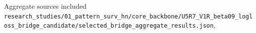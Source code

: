 \documentclass[pdflatex,sn-nature]{sn-jnl}
\begin{document}
Aggregate sources included {\footnotesize\texttt{r\allowbreak{}e\allowbreak{}s\allowbreak{}e\allowbreak{}a\allowbreak{}r\allowbreak{}c\allowbreak{}h\allowbreak{}\_\allowbreak{}s\allowbreak{}t\allowbreak{}u\allowbreak{}d\allowbreak{}i\allowbreak{}e\allowbreak{}s\allowbreak{}/\allowbreak{}0\allowbreak{}1\allowbreak{}\_\allowbreak{}p\allowbreak{}a\allowbreak{}t\allowbreak{}t\allowbreak{}e\allowbreak{}r\allowbreak{}n\allowbreak{}\_\allowbreak{}s\allowbreak{}u\allowbreak{}r\allowbreak{}v\allowbreak{}\_\allowbreak{}h\allowbreak{}n\allowbreak{}/\allowbreak{}c\allowbreak{}o\allowbreak{}r\allowbreak{}e\allowbreak{}\_\allowbreak{}b\allowbreak{}a\allowbreak{}c\allowbreak{}k\allowbreak{}b\allowbreak{}o\allowbreak{}n\allowbreak{}e\allowbreak{}/\allowbreak{}U\allowbreak{}5\allowbreak{}R\allowbreak{}7\allowbreak{}\_\allowbreak{}V\allowbreak{}1\allowbreak{}R\allowbreak{}\_\allowbreak{}b\allowbreak{}e\allowbreak{}t\allowbreak{}a\allowbreak{}0\allowbreak{}9\allowbreak{}\_\allowbreak{}l\allowbreak{}o\allowbreak{}g\allowbreak{}l\allowbreak{}o\allowbreak{}s\allowbreak{}s\allowbreak{}\_\allowbreak{}b\allowbreak{}r\allowbreak{}i\allowbreak{}d\allowbreak{}g\allowbreak{}e\allowbreak{}\_\allowbreak{}c\allowbreak{}a\allowbreak{}n\allowbreak{}d\allowbreak{}i\allowbreak{}d\allowbreak{}a\allowbreak{}t\allowbreak{}e\allowbreak{}/\allowbreak{}s\allowbreak{}e\allowbreak{}l\allowbreak{}e\allowbreak{}c\allowbreak{}t\allowbreak{}e\allowbreak{}d\allowbreak{}\_\allowbreak{}b\allowbreak{}r\allowbreak{}i\allowbreak{}d\allowbreak{}g\allowbreak{}e\allowbreak{}\_\allowbreak{}a\allowbreak{}g\allowbreak{}g\allowbreak{}r\allowbreak{}e\allowbreak{}g\allowbreak{}a\allowbreak{}t\allowbreak{}e\allowbreak{}\_\allowbreak{}r\allowbreak{}e\allowbreak{}s\allowbreak{}u\allowbreak{}l\allowbreak{}t\allowbreak{}s\allowbreak{}.\allowbreak{}j\allowbreak{}s\allowbreak{}o\allowbreak{}n}}, 
\end{document}
